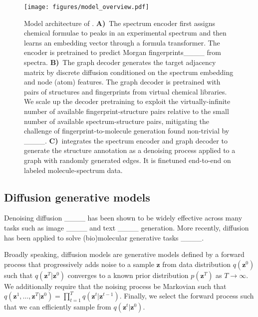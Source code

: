 



\begin{figure*}
    \centering
    \texttt{[image: figures/model\_overview.pdf]}
    \caption{Model architecture of \ours. \textbf{A)}~The spectrum encoder first assigns chemical formulae to peaks in an experimental spectrum and then learns an embedding vector through a formula transformer. The encoder is pretrained to predict Morgan fingerprints____ from spectra. \textbf{B)}~The graph decoder generates the target adjacency matrix by discrete diffusion conditioned on the spectrum embedding and node (atom) features. The graph decoder is pretrained with pairs of structures and fingerprints from virtual chemical libraries. We scale up the decoder pretraining to exploit the virtually-infinite number of available fingerprint-structure pairs relative to the small number of available spectrum-structure pairs, mitigating the challenge of fingerprint-to-molecule generation found non-trivial by ____. \textbf{C)}~\ours integrates the spectrum encoder and graph decoder to generate the structure annotation as a denoising process applied to a graph with randomly generated edges. It is finetuned end-to-end on labeled molecule-spectrum data.} %
    \label{fig:model-overview}
\end{figure*}



\subsection{Diffusion generative models}
Denoising diffusion ____ has been shown to be widely effective across many tasks such as image ____ and text ____ generation. More recently, diffusion has been applied to solve (bio)molecular generative tasks 
____. 

Broadly speaking, diffusion models are generative models defined by a forward process that progressively adds noise to a sample $\bm{z}$ from data distribution $q(\bm{z}^0)$ such that $q(\bm{z}^T | \bm{z}^0)$ converges to a known prior distribution $p(\bm{z}^T)$ as $T \to \infty$. We additionally require that the noising process be Markovian such that $q(\bm{z}^1, \dots, \bm{z}^T | \bm{z}^0) = \prod_{t=1}^Tq(\bm{z}^t | \bm{z}^{t-1})$. Finally, we select the forward process such that we can efficiently sample from $q(\bm{z}^t | \bm{z}^0)$.

